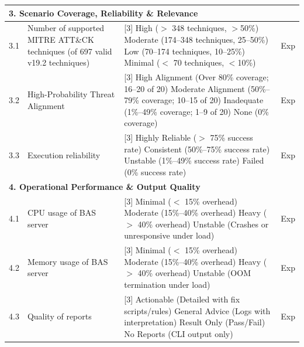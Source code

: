 \begin{longtable}{|l|p{4cm}|p{8cm}|l|}
    \multicolumn{4}{|l|}{\textbf{3. Scenario Coverage, Reliability \& Relevance}} \\
    \hline
    3.1 & Number of supported MITRE ATT\&CK techniques (of 697 valid v19.2 techniques)~\cite{landauer2024,kuhl2007} &
    [3] High ($>$ 348 techniques, $>$50\%) \newline
    [2] Moderate (174--348 techniques, 25--50\%) \newline
    [1] Low (70--174 techniques, 10--25\%) \newline
    [0] Minimal ($<$ 70 techniques, $<$10\%) & Exp \\ \hline
    3.2 & High-Probability Threat Alignment & 
    [3] High Alignment (Over 80\% coverage; 16--20 of 20) \newline 
    [2] Moderate Alignment (50\%--79\% coverage; 10--15 of 20) \newline 
    [1] Inadequate (1\%--49\% coverage; 1--9 of 20) \newline 
    [0] None (0\% coverage) & Exp \\ \hline
    3.3 & Execution reliability & 
    [3] Highly Reliable ($>$ 75\% success rate) \newline 
    [2] Consistent (50\%--75\% success rate) \newline 
    [1] Unstable (1\%--49\% success rate) \newline 
    [0] Failed (0\% success rate) & Exp \\ \hline
    
    \multicolumn{4}{|l|}{\textbf{4. Operational Performance \& Output Quality}} \\
    \hline
    4.1 & CPU usage of BAS server & 
    [3] Minimal ($<$ 15\% overhead) \newline 
    [2] Moderate (15\%--40\% overhead) \newline 
    [1] Heavy ($>$ 40\% overhead) \newline 
    [0] Unstable (Crashes or unresponsive under load) & Exp \\ \hline
    4.2 & Memory usage of BAS server &  
    [3] Minimal ($<$ 15\% overhead) \newline 
    [2] Moderate (15\%--40\% overhead) \newline 
    [1] Heavy ($>$ 40\% overhead) \newline 
    [0] Unstable (OOM termination under load) & Exp \\ \hline
    4.3 & Quality of reports ~\cite{roque2024} & 
    [3] Actionable (Detailed with fix scripts/rules) \newline 
    [2] General Advice (Logs with interpretation) \newline 
    [1] Result Only (Pass/Fail) \newline 
    [0] No Reports (CLI output only) & Exp \\ \hline
    

\end{longtable}
